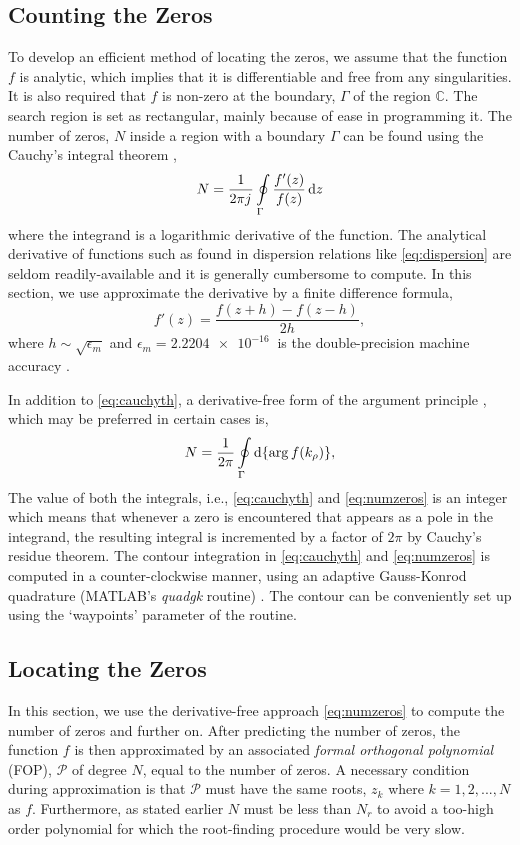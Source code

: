 \subsection{Counting the Zeros}
%
To develop an efficient method of locating the zeros, we assume that the function $f$ is analytic, which implies that it is differentiable and free from any singularities. It is also required that $f$ is non-zero at the boundary, $\Gamma$ of the region $\mathbb{C}$. The search region is set as rectangular, mainly because of ease in programming it. The number of zeros, $N$ inside a region with a boundary $\Gamma$ can be found using the Cauchy's integral theorem \cite[pg. 71]{Krantz1999,Delves1967c},
%
\begin{equation}
  N = \frac{1}{2 \pi {j}\mkern1mu} \oint \limits_{\Gamma} \frac{f'(z)}{f(z)} \mathop{}\!\mathrm{d}{z}
  \label{eq:cauchyth}
\end{equation}
%
where the integrand is a logarithmic derivative of the function. The analytical derivative of functions such as found in dispersion relations like \eqref{eq:dispersion} are seldom readily-available and it is generally cumbersome to compute. In this section, we use approximate the derivative by a finite difference formula,
%
\begin{equation}
  f'(z) = \frac{f(z + h) - f(z - h)}{2 h},
  \label{eq:FD}
\end{equation}
%
where $h \sim \sqrt{\epsilon_m}$ and $\epsilon_m = \SI{2.2204e-16}{}$ is the double-precision machine accuracy \cite[pg. 230]{Press2007}.

In addition to \eqref{eq:cauchyth}, a derivative-free form of the argument principle \cite{Carpentier1982c,Gillan2006c}, which may be preferred in certain cases is,
%
\begin{equation}
 N = \frac{1}{2 \pi} \oint \limits_{\Gamma} \mathop{}\!\mathrm{d} {\{ \arg f(k_{\rho})\}},
 \label{eq:numzeros}
\end{equation}
%
The value of both the integrals, i.e., \eqref{eq:cauchyth} and \eqref{eq:numzeros} is an integer which means that whenever a zero is encountered that appears as a pole in the integrand, the resulting integral is incremented by a factor of $2 \pi$ by Cauchy's residue theorem. The contour integration in \eqref{eq:cauchyth} and \eqref{eq:numzeros} is computed in a counter-clockwise manner, using an adaptive Gauss-Konrod quadrature ({MATLAB}'s \emph{quadgk} routine) \cite{Shampine2008}. The contour can be conveniently set up using the `waypoints' parameter of the routine.
\subsection{Locating the Zeros}
%
In this section, we use the derivative-free approach \eqref{eq:numzeros} to compute the number of zeros and further on. After predicting the number of zeros, the function $f$ is then approximated by an associated \emph{formal orthogonal polynomial} (FOP), $\mathcal P$ of degree $N$, equal to the number of zeros. A necessary condition during approximation is that $\mathcal P$ must have the same roots, $z_k$ where $k = 1,2,...,N$ as $f$. Furthermore, as stated earlier $N$ must be less than $N_r$ to avoid a too-high order polynomial for which the root-finding procedure would be very slow.

